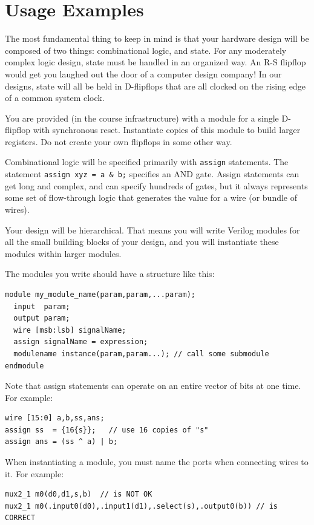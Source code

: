 \documentclass[11pt]{article}
\begin{document}
\section{Usage Examples}

The most fundamental thing to keep in mind is that your hardware design will be composed of two things:
combinational logic, and state. For any moderately complex logic design, state must be handled in an
organized way. An R-S flipflop would get you laughed out the door of a computer design company! In our
designs, state will all be held in D-flipflops that are all clocked on the rising edge of a common system clock.

You are provided (in the course infrastructure) with a module for a single D-flipflop with synchronous reset.
Instantiate copies of this module to build larger registers. Do not create your own flipflops in some other way.

Combinational logic will be specified primarily with \texttt{assign} statements. The statement
\texttt{assign xyz = a \& b;} specifies an AND gate. Assign statements can get long and complex, and can specify
hundreds of gates, but it always represents some set of flow-through logic that generates the value for a wire
(or bundle of wires).

Your design will be hierarchical. That means you will write Verilog modules for all the small building blocks of
your design, and you will instantiate these modules within larger modules.

The modules you write should have a structure like this:
\begin{lstlisting}
module my_module_name(param,param,...param);
  input  param;
  output param;
  wire [msb:lsb] signalName;
  assign signalName = expression;
  modulename instance(param,param...); // call some submodule
endmodule
\end{lstlisting}

Note that assign statements can operate on an entire vector of bits at one time. For example:
\begin{lstlisting}
wire [15:0] a,b,ss,ans;
assign ss  = {16{s}};   // use 16 copies of "s"
assign ans = (ss ^ a) | b;
\end{lstlisting}

When instantiating a module, you must name the ports when connecting wires to it. For example:
\begin{lstlisting}
mux2_1 m0(d0,d1,s,b)  // is NOT OK
mux2_1 m0(.input0(d0),.input1(d1),.select(s),.output0(b)) // is CORRECT
\end{lstlisting}
\end{document}

